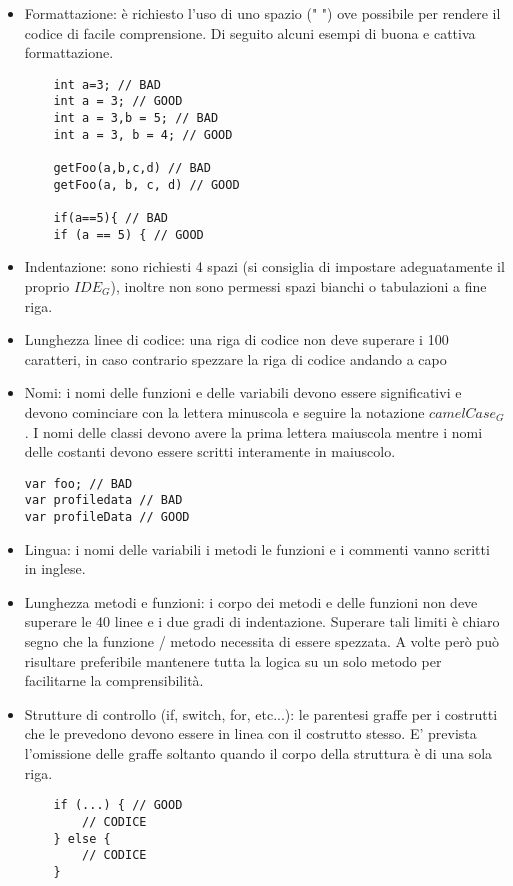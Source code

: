 			\begin{itemize}
			\item Formattazione: è richiesto l'uso di uno spazio (" ") ove possibile per rendere il codice di facile comprensione.
			Di seguito alcuni  esempi di buona e cattiva formattazione.
\begin{lstlisting}
	int a=3; // BAD
	int a = 3; // GOOD
	int a = 3,b = 5; // BAD
	int a = 3, b = 4; // GOOD

	getFoo(a,b,c,d) // BAD
	getFoo(a, b, c, d) // GOOD

	if(a==5){ // BAD
	if (a == 5) { // GOOD
\end{lstlisting}
			
			\item Indentazione: sono richiesti 4 spazi (si consiglia di impostare adeguatamente il proprio $IDE_G$), inoltre non sono permessi spazi bianchi o tabulazioni a fine riga.
			
			\item Lunghezza linee di codice: una riga di codice non deve superare i 100 caratteri, in caso contrario spezzare la riga di codice andando a capo
			
			\item Nomi: i nomi delle funzioni e delle variabili devono essere significativi e devono cominciare con la lettera minuscola e seguire la notazione $camelCase_G$. I nomi delle classi devono avere la prima lettera maiuscola mentre i nomi delle costanti devono essere scritti interamente in maiuscolo.
\begin{lstlisting}
var foo; // BAD
var profiledata // BAD
var profileData // GOOD
\end{lstlisting}
			
			\item Lingua: i nomi delle variabili i metodi le funzioni e i commenti vanno scritti in inglese.
			
			\item Lunghezza metodi e funzioni: i corpo dei metodi e delle funzioni non deve superare le 40 linee e i due gradi di indentazione. Superare tali limiti è chiaro segno che la funzione / metodo necessita di essere spezzata. A volte però può risultare preferibile mantenere tutta la logica su un solo metodo per facilitarne la comprensibilità. 
			
			\item Strutture di controllo (if, switch, for, etc...): le parentesi graffe per i costrutti che le prevedono devono essere in linea con il costrutto stesso. E' prevista l'omissione delle graffe soltanto quando il corpo della struttura è di una sola riga.
\begin{lstlisting}
	if (...) { // GOOD
		// CODICE
	} else {
		// CODICE
	}



\end{lstlisting}
\end{itemize}

